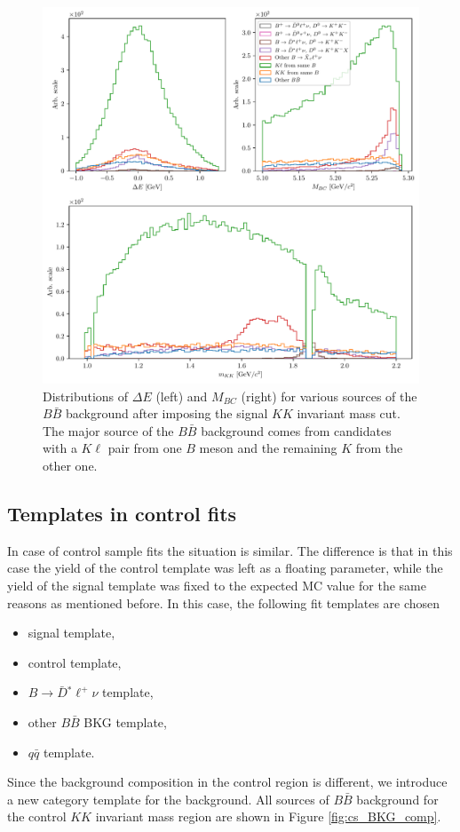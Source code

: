 \begin{figure}[H]
	\centering
	\captionsetup{width=0.8\linewidth}
	\includegraphics[width=\linewidth]{fig/sig_BKG_composition}
	\caption{Distributions of $\Delta E$ (left) and $M_{BC}$ (right) for various sources of the $B \bar B$ background after imposing the signal $KK$ invariant mass cut. The major source of the $B \bar B$ background comes from candidates with a $K\ell$ pair from one $B$ meson and the remaining $K$ from the other one.}
	\label{fig:sig_BKG_comp}
\end{figure}

\subsection{Templates in control fits}

In case of control sample fits the situation is similar. The difference is that in this case the yield of the control template was left as a floating parameter, while the yield of the signal template was fixed to the expected MC value for the same reasons as mentioned before. In this case, the following fit templates are chosen
\begin{itemize}
	\item signal template,
	\item control template,
	\item $B \to \bar D {}^* \ell^+ \nu$ template,
	\item other $B \bar B$ BKG template,
	\item $q \bar q$ template.
\end{itemize}
Since the background composition in the control region is different, we introduce a new category template for the background.  All sources of $B \bar B$ background for the control $KK$ invariant mass region are shown in Figure \ref{fig:cs_BKG_comp}.

